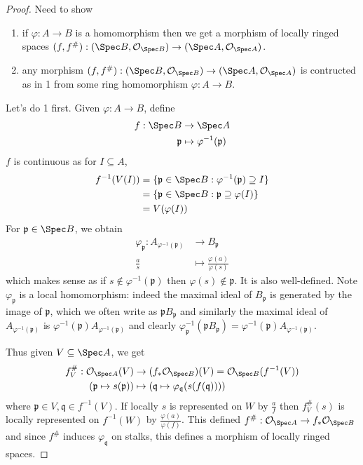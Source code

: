 \documentclass[a4paper]{article}
\newcommand{\sh}[1]{\mathcal{#1}} %
\begin{document}
\begin{proof}
  Need to show
  \begin{enumerate}
  \item if \(\varphi: A \to B\) is a homomorphism then we get a morphism of locally ringed spaces \((f, f^\#): (\Spec B, \sh O_{\Spec B}) \to (\Spec A, \sh O_{\Spec A})\).
  \item any morphism \((f, f^\#): (\Spec B, \sh O_{\Spec B}) \to (\Spec A, \sh O_{\Spec A})\) is contructed as in 1 from some ring homomorphism \(\varphi: A \to B\).
  \end{enumerate}

  Let's do 1 first. Given \(\varphi: A \to B\), define
  \begin{align*}
    f: \Spec B &\to \Spec A \\
    \mathfrak p &\mapsto \varphi^{-1}(\mathfrak p)
  \end{align*}
  \(f\) is continuous as for \(I \subseteq A\),
  \begin{align*}
    f^{-1}(V(I))
    &= \{\mathfrak p \in \Spec B: \varphi^{-1}(\mathfrak p) \supseteq I\} \\
    &= \{\mathfrak p \in \Spec B: \mathfrak p \supseteq \varphi(I)\} \\
    &= V(\varphi(I))
  \end{align*}
  For \(\mathfrak p \in \Spec B\), we obtain
  \begin{align*}
    \varphi_{\mathfrak p}: A_{\varphi^{-1}({\mathfrak p})} &\to B_{\mathfrak p} \\
    \frac{a}{s} &\mapsto \frac{\varphi(a)}{\varphi(s)}
  \end{align*}
  which makes sense as if \(s \notin \varphi^{-1}(\mathfrak p)\) then \(\varphi(s) \notin \mathfrak p\). It is also well-defined. Note \(\varphi_{\mathfrak p}\) is a local homomorphism: indeed the maximal ideal of \(B_{\mathfrak p}\) is generated by the image of \(\mathfrak p\), which we often write as \(\mathfrak p B_{\mathfrak p}\) and similarly the maximal ideal of \(A_{\varphi^{-1}(\mathfrak p)}\) is \(\varphi^{-1}(\mathfrak p) A_{\varphi^{-1}(\mathfrak p)}\) and clearly \(\varphi_{\mathfrak p}^{-1} (\mathfrak p B_{\mathfrak p}) = \varphi^{-1}(\mathfrak p) A_{\varphi^{-1}(\mathfrak p)}\).

  Thus given \(V \subseteq \Spec A\), we get
  \begin{align*}
    f_V^\#: \sh O_{\Spec A} (V) &\to (f_* \sh O_{\Spec B})(V) = \sh O_{\Spec B}(f^{-1}(V)) \\
    (\mathfrak p \mapsto s(\mathfrak p)) &\mapsto (\mathfrak q \mapsto \varphi_{\mathfrak q} (s (f(\mathfrak q))))
  \end{align*}
  where \(\mathfrak p \in V, \mathfrak q \in f^{-1}(V)\). If locally \(s\) is represented on \(W\) by \(\frac{a}{f}\) then \(f_V^\#(s)\) is locally represented on \(f^{-1}(W)\) by \(\frac{\varphi(a)}{\varphi(f)}\). This defined \(f^\#: \sh O_{\Spec A} \to f_* \sh O_{\Spec B}\) and since \(f^\#\) induces \(\varphi_{\mathfrak q}\) on stalks, this defines a morphism of locally ringed spaces.


\end{proof}
\end{document}
